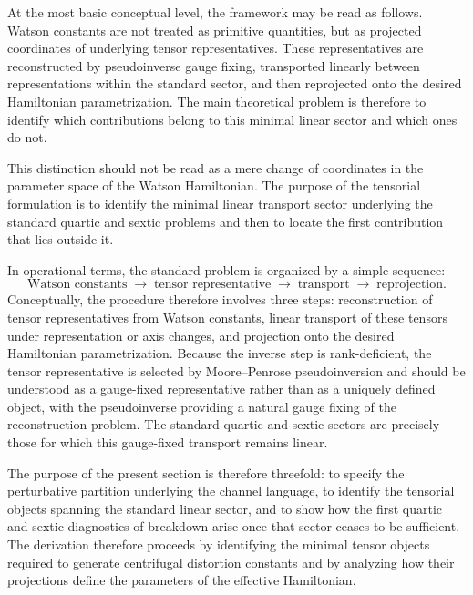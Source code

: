 \documentclass[journal=jacsat,manuscript=article]{achemso}
\begin{document}
At the most basic conceptual level, the framework may be read as
follows. Watson constants are not treated as primitive quantities, but
as projected coordinates of underlying tensor representatives. These
representatives are reconstructed by pseudoinverse gauge fixing,
transported linearly between representations within the standard
sector, and then reprojected onto the desired Hamiltonian
parametrization. The main theoretical problem is therefore to identify
which contributions belong to this minimal linear sector and which ones
do not.

This distinction should not be read as a mere change of coordinates in
the parameter space of the Watson Hamiltonian. The purpose of the
tensorial formulation is to identify the minimal linear transport
sector underlying the standard quartic and sextic problems and then to
locate the first contribution that lies outside it.

In operational terms, the standard problem is organized by a simple
sequence:
\begin{equation}
\text{Watson constants}
\;\longrightarrow\;
\text{tensor representative}
\;\longrightarrow\;
\text{transport}
\;\longrightarrow\;
\text{reprojection}.
\end{equation}
Conceptually, the procedure therefore involves three steps:
reconstruction of tensor representatives from Watson constants, linear
transport of these tensors under representation or axis changes, and
projection onto the desired Hamiltonian parametrization.
Because the inverse step is rank-deficient, the tensor representative
is selected by Moore--Penrose pseudoinversion and should be understood
as a gauge-fixed representative rather than as a uniquely defined
object, with the pseudoinverse providing a natural gauge fixing of the
reconstruction problem.\cite{Penrose1955} The standard quartic and sextic sectors are precisely those for
which this gauge-fixed transport remains linear.

The purpose of the present section is therefore threefold: to specify
the perturbative partition underlying the channel language, to identify
the tensorial objects spanning the standard linear sector, and to show
how the first quartic and sextic diagnostics of breakdown arise once
that sector ceases to be sufficient.
The derivation therefore proceeds by identifying the minimal tensor
objects required to generate centrifugal distortion constants and by
analyzing how their projections define the parameters of the effective
Hamiltonian.
\end{document}
